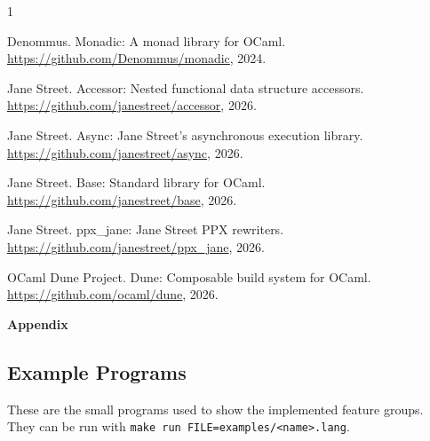 \documentclass[a4paper]{article}
\renewcommand{\thesubsection}{\arabic{subsection}}
\renewcommand{\thesubsubsection}{\thesubsection.\arabic{subsubsection}}
\begin{document}
\begin{thebibliography}{1}

{Denommus}.
\newblock Monadic: A monad library for OCaml.
\newblock \url{https://github.com/Denommus/monadic}, 2024.

{Jane Street}.
\newblock Accessor: Nested functional data structure accessors.
\newblock \url{https://github.com/janestreet/accessor}, 2026.

{Jane Street}.
\newblock Async: Jane Street's asynchronous execution library.
\newblock \url{https://github.com/janestreet/async}, 2026.

{Jane Street}.
\newblock Base: Standard library for OCaml.
\newblock \url{https://github.com/janestreet/base}, 2026.

{Jane Street}.
\newblock ppx\_jane: Jane Street PPX rewriters.
\newblock \url{https://github.com/janestreet/ppx_jane}, 2026.

{OCaml Dune Project}.
\newblock Dune: Composable build system for OCaml.
\newblock \url{https://github.com/ocaml/dune}, 2026.

\end{thebibliography}

\clearpage
\appendix
\setcounter{subsection}{0}
\setcounter{subsubsection}{0}
\renewcommand{\thesubsection}{\Alph{subsection}}
\renewcommand{\thesubsubsection}{\thesubsection.\arabic{subsubsection}}
\begin{center}
  {\Huge\bfseries Appendix}
\end{center}
\vspace{1em}

\subsection{Example Programs}
\label{appendix:examples}

These are the small programs used to show the implemented feature groups. They
can be run with \texttt{make run FILE=examples/<name>.lang}.
\end{document}
